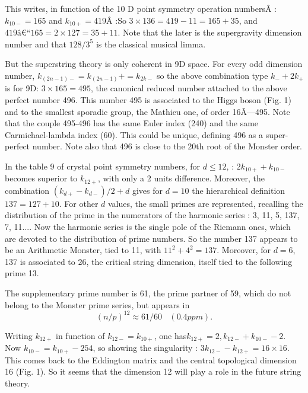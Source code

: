 \documentclass[a4paper,9pt]{article}
\begin{document}
     
     This writes, in function of the 10 D point symmetry operation numbersÂ :  $k_{10-} = 165$ and $k_{10+} = 419$Â :So  $3 \times 136 = 419 - 11 = 165 + 35$, and $419 â€“ 165 = 2 \times 127 =  35 + 11$. Note that the later is the supergravity dimension number and that $128/3^5$ is the classical musical limma. 
     
     
     But the superstring theory is only coherent in 9D space. For every odd dimension number, $k_{(2n - 1)-} = k_(2n - 1)+ = k_{2k-}$ so the above combination type $k_- + 2k_+$ is for 9D: $3 \times 165 = 495$, the canonical reduced number attached to the above perfect number 496. This number 495 is associated to the Higgs boson (Fig. 1) and to the smallest sporadic group, the Mathieu one, of order 16Ã—495. Note that the couple 495-496 has the same Euler index (240) and the same Carmichael-lambda index (60). This could be unique, defining 496 as a super-perfect number. Note also that 496 is close to the 20th root of the Monster order.
     
     
     In the table 9 of crystal point symmetry numbers, for $d \le 12$, : $2k_{10+} +  k_{10-}$ becomes superior to $k_{12+}$, with only a 2 units difference. Moreover, the combination $(k_{d+} -  k_{d-})/2 + d$ gives for $d = 10$ the hierarchical definition $  137 = 127 + 10$. For other $d$ values, the small primes are represented, recalling the distribution of the prime in the numerators of the harmonic series : 3, 11, 5, 137, 7, 11.... Now the harmonic series is the single pole of the Riemann ones, which are devoted to the distribution of prime numbers. So the number 137 appears to be an Arithmetic Monster, tied to 11, with $11^2 +  4^2 = 137$. Moreover, for $d = 6$, 137 is associated to 26, the critical string dimension, itself tied to the following prime 13.
  
    The supplementary prime number is 61, the prime partner of 59, which do not belong to the Monster prime series, but appears in
    \begin{equation}
    (n/p)^{12} \approx 61/60~~~~   (0.4 ppm).    
    \end{equation}
    
    
    Writing $k_{12+}$ in function of $k_{12-} = k_{10+}$, one has$ k_{12+} = 2,  k_{12-} + k_{10-} - 2$. Now   $k_{10-} = k_{10+} - 254$, so showing the singularity : $3k_{12-} - k_{12+}  = 16 \times 16$. This comes back to the Eddington matrix and the central topological dimension 16 (Fig. 1). So it seems that the dimension 12 will play a role in the future string theory.
    
\end{document}
